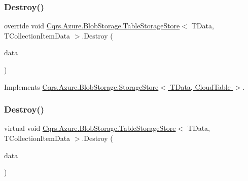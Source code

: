 \subsubsection{\texorpdfstring{Destroy()}{Destroy()}\hspace{0.1cm}{\footnotesize\ttfamily [1/2]}}
{\footnotesize\ttfamily override void \hyperlink{classCqrs_1_1Azure_1_1BlobStorage_1_1TableStorageStore}{Cqrs.\+Azure.\+Blob\+Storage.\+Table\+Storage\+Store}$<$ T\+Data, T\+Collection\+Item\+Data $>$.Destroy (\begin{DoxyParamCaption}\item[{T\+Data}]{data }\end{DoxyParamCaption})\hspace{0.3cm}{\ttfamily [virtual]}}



Implements \hyperlink{classCqrs_1_1Azure_1_1BlobStorage_1_1StorageStore_a9879b4ab18c2a33d7e20bc0b3a734195_a9879b4ab18c2a33d7e20bc0b3a734195}{Cqrs.\+Azure.\+Blob\+Storage.\+Storage\+Store$<$ T\+Data, Cloud\+Table $>$}.

\mbox{\label{classCqrs_1_1Azure_1_1BlobStorage_1_1TableStorageStore_a0b408504b9553b9c649b7186a382052a_a0b408504b9553b9c649b7186a382052a}} 
\subsubsection{\texorpdfstring{Destroy()}{Destroy()}\hspace{0.1cm}{\footnotesize\ttfamily [2/2]}}
{\footnotesize\ttfamily virtual void \hyperlink{classCqrs_1_1Azure_1_1BlobStorage_1_1TableStorageStore}{Cqrs.\+Azure.\+Blob\+Storage.\+Table\+Storage\+Store}$<$ T\+Data, T\+Collection\+Item\+Data $>$.Destroy (\begin{DoxyParamCaption}\item[{T\+Collection\+Item\+Data}]{data }\end{DoxyParamCaption})\hspace{0.3cm}{\ttfamily [virtual]}}

\mbox{\label{classCqrs_1_1Azure_1_1BlobStorage_1_1TableStorageStore_a7a6e253d7d4f6d40a2b59e804f68c5c4_a7a6e253d7d4f6d40a2b59e804f68c5c4}} 

